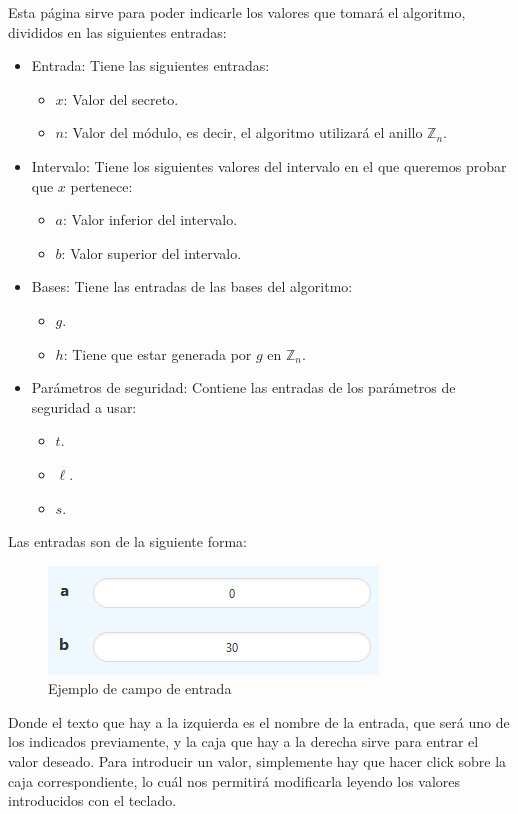 Esta página sirve para poder indicarle los valores que tomará el algoritmo, divididos en las siguientes entradas:
\begin{itemize}
    \item Entrada: Tiene las siguientes entradas:
    \begin{itemize}
        \item $x$: Valor del secreto.
        \item $n$: Valor del módulo, es decir, el algoritmo utilizará el anillo $\mathbb{Z}_{n}$.
    \end{itemize}
    \item Intervalo: Tiene los siguientes valores del intervalo en el que queremos probar que $x$ pertenece:
    \begin{itemize}
        \item $a$: Valor inferior del intervalo.
        \item $b$: Valor superior del intervalo.
    \end{itemize}
    \item Bases: Tiene las entradas de las bases del algoritmo:
    \begin{itemize}
        \item $g$.
        \item $h$: Tiene que estar generada por $g$ en $\mathbb{Z}_{n}$.
    \end{itemize}
    \item Parámetros de seguridad: Contiene las entradas de los parámetros de seguridad a usar:
    \begin{itemize}
        \item $t$.
        \item $\ell$.
        \item $s$.
    \end{itemize}
\end{itemize}

Las entradas son de la siguiente forma:
\begin{figure}[H]
    \centering
    \includegraphics[width=0.5\linewidth]{images/anexoA/input_box.png}
    \caption{Ejemplo de campo de entrada}
    \label{im:input_box}
\end{figure}

Donde el texto que hay a la izquierda es el nombre de la entrada, que será uno de los indicados previamente, y la caja que hay a la derecha sirve para entrar el valor deseado. Para introducir un valor, simplemente hay que hacer click sobre la caja correspondiente, lo cuál nos permitirá modificarla leyendo los valores introducidos con el teclado.

